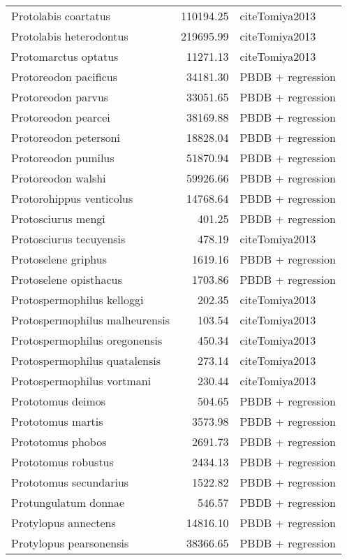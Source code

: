 \begin{table}[ht]
\begin{tabular}{lrl}
  Protolabis coartatus & 110194.25 & cite{Tomiya2013} \\ 
  Protolabis heterodontus & 219695.99 & cite{Tomiya2013} \\ 
  Protomarctus optatus & 11271.13 & cite{Tomiya2013} \\ 
  Protoreodon pacificus & 34181.30 & PBDB + regression \\ 
  Protoreodon parvus & 33051.65 & PBDB + regression \\ 
  Protoreodon pearcei & 38169.88 & PBDB + regression \\ 
  Protoreodon petersoni & 18828.04 & PBDB + regression \\ 
  Protoreodon pumilus & 51870.94 & PBDB + regression \\ 
  Protoreodon walshi & 59926.66 & PBDB + regression \\ 
  Protorohippus venticolus & 14768.64 & PBDB + regression \\ 
  Protosciurus mengi & 401.25 & PBDB + regression \\ 
  Protosciurus tecuyensis & 478.19 & cite{Tomiya2013} \\ 
  Protoselene griphus & 1619.16 & PBDB + regression \\ 
  Protoselene opisthacus & 1703.86 & PBDB + regression \\ 
  Protospermophilus kelloggi & 202.35 & cite{Tomiya2013} \\ 
  Protospermophilus malheurensis & 103.54 & cite{Tomiya2013} \\ 
  Protospermophilus oregonensis & 450.34 & cite{Tomiya2013} \\ 
  Protospermophilus quatalensis & 273.14 & cite{Tomiya2013} \\ 
  Protospermophilus vortmani & 230.44 & cite{Tomiya2013} \\ 
  Prototomus deimos & 504.65 & PBDB + regression \\ 
  Prototomus martis & 3573.98 & PBDB + regression \\ 
  Prototomus phobos & 2691.73 & PBDB + regression \\ 
  Prototomus robustus & 2434.13 & PBDB + regression \\ 
  Prototomus secundarius & 1522.82 & PBDB + regression \\ 
  Protungulatum donnae & 546.57 & PBDB + regression \\ 
  Protylopus annectens & 14816.10 & PBDB + regression \\ 
  Protylopus pearsonensis & 38366.65 & PBDB + regression \\ 

\end{tabular}
\end{table}
